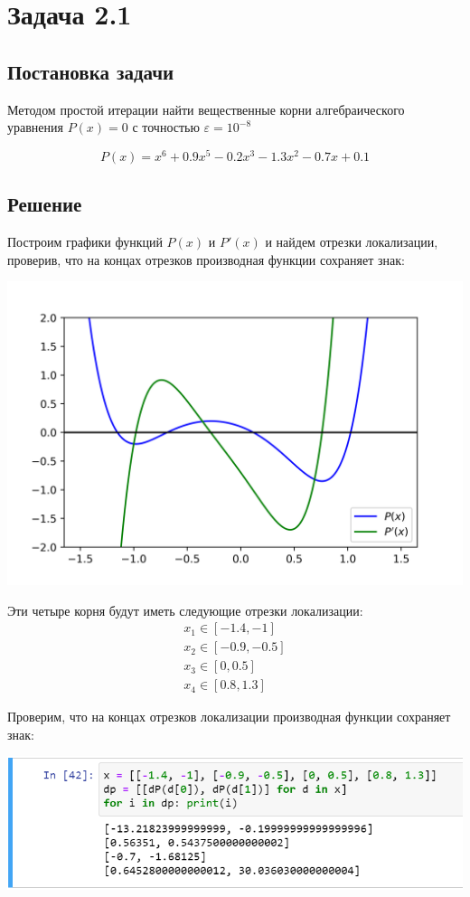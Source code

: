 \documentclass[a4paper,12pt]{report} %
\begin{document}
\section*{Задача 2.1}
\subsection*{Постановка задачи}
Методом простой итерации найти вещественные корни алгебраического уравнения $P(x) = 0$ с точностью $\varepsilon = 10^{-8}$

\[
	P(x) = x^6 + 0.9x^5 - 0.2x^3 - 1.3x^2 - 0.7x + 0.1
\]

\subsection*{Решение}
Построим графики функций $P(x)$ и $P'(x)$ и найдем отрезки локализации, проверив, что на концах отрезков производная функции сохраняет знак:

\noindent \includegraphics{2.1_plot.png}

Эти четыре корня будут иметь следующие отрезки локализации:
\begin{gather*}
	x_1 \in [-1.4, -1] \\
	x_2 \in [-0.9, -0.5] \\
	x_3 \in [0, 0.5] \\
	x_4 \in [0.8, 1.3]
\end{gather*}

Проверим, что на концах отрезков локализации производная функции сохраняет знак:

\noindent \includegraphics{2.1_dP.png}
\end{document}

